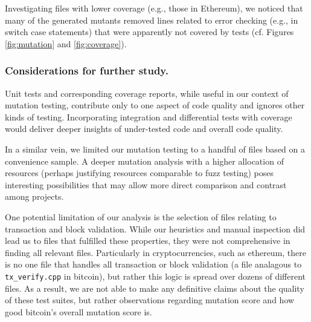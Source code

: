 %

Investigating files with lower coverage (e.g., those in Ethereum), we noticed
that many of the generated mutants removed lines related to error checking
(e.g., in switch case statements) that were apparently not covered by tests (cf.
Figures \ref{fig:mutation} and \ref{fig:coverage}).

%

\subsubsection*{Considerations for further study.}

Unit tests and corresponding coverage reports, while useful in our context of
mutation testing, contribute only to one aspect of code quality and ignores
other kinds of testing. Incorporating integration and differential tests with
coverage would deliver deeper insights of under-tested code and overall code quality.

In a similar vein, we limited our mutation testing to a handful of files based
on a convenience sample. A deeper mutation analysis with a higher allocation of
resources (perhaps justifying resources comparable to fuzz testing) poses interesting
possibilities that may allow more direct comparison and contrast among projects.

\iffalse
One potential limitation of our analysis is the selection of files relating to transaction and block validation. While our heuristics and manual inspection did lead us to files that fulfilled these
properties, they were not comprehensive in finding all relevant files.
Particularly in cryptocurrencies, such as ethereum, there is no one file that
handles all transaction or block validation (a file analagous to {\tt
  tx\_verify.cpp} in bitcoin), but rather this logic is spread over dozens of
different files. As a result, we are not able to make any definitive claims
about the quality of these test suites, but rather observations regarding
mutation score and how good bitcoin's overall mutation score is.

